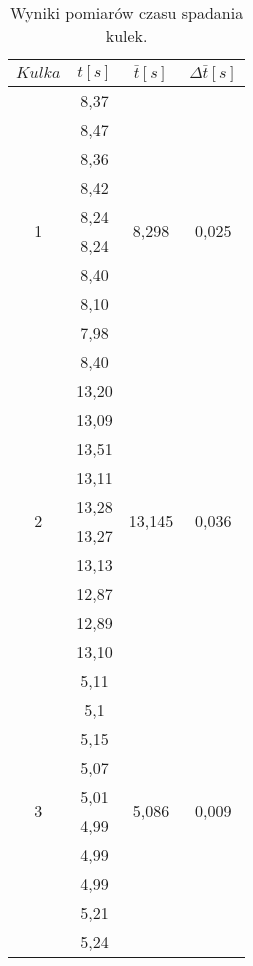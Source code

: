 \documentclass[wide,a4paper,titlepage,12pt]{mwart}
\begin{document}
    \begin{table}
      \begin{center}
        \begin{tabular}{|c|c|c|c|}
          \hline
            $Kulka$ &
            $t[s]$ &
            $\bar{t}[s]$ &
            $\Delta \bar{t}[s]$ \\
          \hline
          	\multirow{10}{*}{1} &
            8,37 &
            \multirow{10}{*}{8,298} &
            \multirow{10}{*}{0,025} \\
            & 8,47 & & \\
            & 8,36 & & \\
            & 8,42 & & \\
            & 8,24 & & \\
            & 8,24 & & \\
            & 8,40 & & \\
            & 8,10 & & \\
            & 7,98 & & \\
            & 8,40 & & \\
          \hline
            \multirow{10}{*}{2} &
            13,20 &
            \multirow{10}{*}{13,145} &
            \multirow{10}{*}{0,036} \\
            & 13,09 & & \\
            & 13,51 & & \\
            & 13,11 & & \\
            & 13,28 & & \\
            & 13,27 & & \\
            & 13,13 & & \\
            & 12,87 & & \\
            & 12,89 & & \\
            & 13,10 & & \\
          \hline
            \multirow{10}{*}{3} &
            5,11 &
            \multirow{10}{*}{5,086} &
            \multirow{10}{*}{0,009} \\
            & 5,1 & & \\
            & 5,15 & & \\
            & 5,07 & & \\
            & 5,01 & & \\
            & 4,99 & & \\
            & 4,99 & & \\
            & 4,99 & & \\
            & 5,21 & & \\
            & 5,24 & & \\
          \hline
        \end{tabular}
      \end{center}
      \caption{\label{czas}Wyniki pomiarów czasu spadania kulek.}
    \end{table}
    
\end{document}
